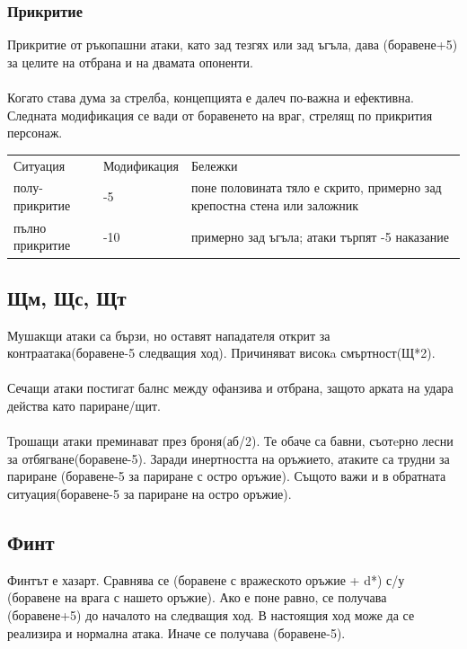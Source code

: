 \subsubsection{Прикритие}
Прикритие от ръкопашни атаки, като зад тезгях или зад ъгъла, дава (боравене+5) за целите на отбрана и на двамата опоненти.
\\
\\
Когато става дума за стрелба, концепцията е далеч по-важна и ефективна.
Следната модификация се вади от боравенето на враг, стрелящ по прикрития персонаж.
\\
\begin{tabular}{l | l | p{10cm}}
Ситуация        & Модификация & Бележки \\
полу-прикритие  & -5          & поне половината тяло е скрито, примерно зад крепостна стена или заложник \\
пълно прикритие & -10         & примерно зад ъгъла; атаки търпят -5 наказание                            \\
\end{tabular}


\subsection{Щм, Щс, Щт}
Мушакщи атаки са бързи, но оставят нападателя открит за контраатака(боравене-5 следващия ход).
Причиняват високa смъртност(Щ*2).
\\
\\
Сечащи атаки постигат балнс между офанзива и отбрана, защото арката на удара действа като париране/щит.
\\
\\
Трошащи атаки преминават през броня(аб/2).
Те обаче са бавни, съотeрно лесни за отбягване(боравене-5).
Заради инертността на оръжието, атаките са трудни за париране (боравене-5 за париране с остро оръжие).
Същото важи и в обратната ситуация(боравене-5 за париране на остро оръжие).


\subsection{Финт}
Финтът е хазарт.
Сравнява се (боравене с вражеското оръжие + d*) с/у (боравене на врага с нашето оръжие).
Ако е поне равно, се получава (боравене+5) до началото на следващия ход.
В настоящия ход може да се реализира и нормална атака.
Иначе се получава (боравене-5).


